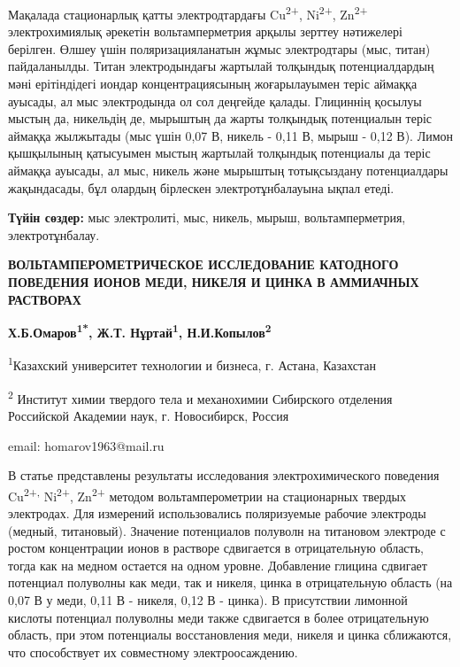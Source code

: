 Мақалада стационарлық қатты электродтардағы Cu\textsuperscript{2+},
Ni\textsuperscript{2+}, Zn\textsuperscript{2+} электрохимиялық әрекетін
вольтамперметрия арқылы зерттеу нәтижелері берілген. Өлшеу үшін
поляризацияланатын жұмыс электродтары (мыс, титан) пайдаланылды. Титан
электродындағы жартылай толқындық потенциалдардың мәні ерітіндідегі
иондар концентрациясының жоғарылауымен теріс аймаққа ауысады, ал мыс
электродында ол сол деңгейде қалады. Глициннің қосылуы мыстың да,
никельдің де, мырыштың да жарты толқындық потенциалын теріс аймаққа
жылжытады (мыс үшін 0,07 В, никель - 0,11 В, мырыш - 0,12 В). Лимон
қышқылының қатысуымен мыстың жартылай толқындық потенциалы да теріс
аймаққа ауысады, ал мыс, никель және мырыштың тотықсыздану потенциалдары
жақындасады, бұл олардың бірлескен электротұнбалауына ықпал етеді.

{\bfseries Түйін сөздер:} мыс электролиті, мыс, никель, мырыш,
вольтамперметрия, электротұнбалау.

\begin{center}
{\large\bfseries ВОЛЬТАМПЕРОМЕТРИЧЕСКОЕ ИССЛЕДОВАНИЕ КАТОДНОГО ПОВЕДЕНИЯ ИОНОВ
МЕДИ, НИКЕЛЯ И ЦИНКА В АММИАЧНЫХ РАСТВОРАХ}

\vspace{1em}
{\bfseries Х.Б.Омаров\textsuperscript{1*}, Ж.Т. Нұртай\textsuperscript{1},
Н.И.Копылов\textsuperscript{2}}

\textsuperscript{1}Казахский университет технологии и бизнеса, г.
Астана, Казахстан

\textsuperscript{2} Институт химии твердого тела и механохимии
Сибирского отделения Российской Академии наук, г. Новосибирск, Россия

email: homarov1963@mail.ru
\end{center}

В статье представлены результаты исследования электрохимического
поведения Cu\textsuperscript{2+,} Ni\textsuperscript{2+},
Zn\textsuperscript{2+} методом вольтамперометрии на стационарных твердых
электродах. Для измерений использовались поляризуемые рабочие электроды
(медный, титановый). Значение потенциалов полуволн на титановом
электроде с ростом концентрации ионов в растворе сдвигается в
отрицательную область, тогда как на медном остается на одном уровне.
Добавление глицина сдвигает потенциал полуволны как меди, так и никеля,
цинка в отрицательную область (на 0,07 В у меди, 0,11 В - никеля, 0,12 В
- цинка). В присутствии лимонной кислоты потенциал полуволны меди также
сдвигается в более отрицательную область, при этом потенциалы
восстановления меди, никеля и цинка сближаются, что способствует их
совместному электроосаждению.

